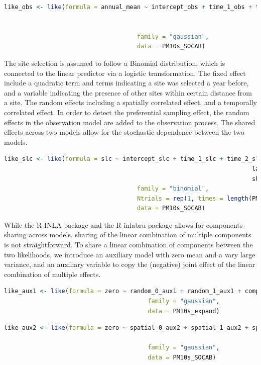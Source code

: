 \begin{lstlisting}[language = R]
	like_obs <- like(formula = annual_mean ~ intercept_obs + time_1_obs + time_2_obs +     
																					 random_0_obs + random_1_obs + 
																					 spatial_0_obs + spatial_1_obs + spatial_2_obs,  
									 family = "gaussian",  
									 data = PM10s_SOCAB)
\end{lstlisting} \label{code:inlabru_lik_obs}

The site selection is assumed to follow a Binomial distribution, which is connected to the linear
predictor via a logistic transformation. The fixed effect include a quadratic term and terms 
indicating a site was selected a year before, and a variable indicating the presence of other sites
within certain distance from a site. The random effects including a spatially correlated effect,
and a temporally correlated effect. In order to detect the preferential sampling effect, the random
effects in the observation model are added to the observation process. The shared effects across two
models allow for the stochastic dependence between the two models.

\begin{lstlisting}[language = R]
	like_slc <- like(formula = slc ~ intercept_slc + time_1_slc + time_2_slc +     
																	 lag_slc + repuls_slc + ar_slc + spatial_slc +     
																	 share_aux1 + share_aux2,  
									 family = "binomial",  
									 Ntrials = rep(1, times = length(PM10s_SOCAB$slc)),  
									 data = PM10s_SOCAB)
\end{lstlisting} \label{code:inlabru_lik_slc}

While the R-INLA package and the R-inlabru package allows for components sharing across models, 
sharing of the linear combination of multiple components is not straightforward. To share a linear
combination of components between the two likelihoods, we introduce an auxiliary model with zero 
mean and a vary large variance, and an auxiliary variable to copy the (negative) joint effect of 
the linear combination of multiple effects. 

\begin{lstlisting}[language = R]
	like_aux1 <- like(formula = zero ~ random_0_aux1 + random_1_aux1 + comp_aux1,  
										family = "gaussian",  
										data = PM10s_expand)
\end{lstlisting} \label{code:inlabru_lik_aux1}

\begin{lstlisting}[language = R]
	like_aux2 <- like(formula = zero ~ spatial_0_aux2 + spatial_1_aux2 + spatial_2_aux2 + 
																		 comp_aux2,  
										family = "gaussian",  
										data = PM10s_SOCAB)
\end{lstlisting} \label{code:inlabru_lik_aux2}

